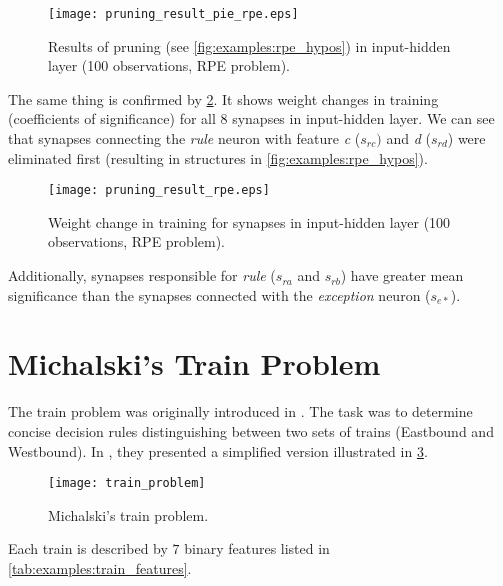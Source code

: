 \begin{figure}[H]
\centering
\texttt{[image: pruning\_result\_pie\_rpe.eps]}
\caption{Results of pruning (see \cref{fig:examples:rpe_hypos}) in input-hidden layer (100 observations, RPE problem).}
\label{fig:examples:pruning_result_pie_rpe}
\end{figure}

The same thing is confirmed by \cref{fig:examples:pruning_result_rpe}. It shows weight changes in training (coefficients of significance) for all 8 synapses in input-hidden layer. We can see that synapses connecting the \textit{rule} neuron with feature \textit{c} ($ s_{rc}) $ and \textit{d} ($ s_{rd} $) were eliminated first (resulting in structures in \cref{fig:examples:rpe_hypos}).

\begin{figure}[H]
\centering
\texttt{[image: pruning\_result\_rpe.eps]}
\caption{Weight change in training for synapses in input-hidden layer (100 observations, RPE problem).}
\label{fig:examples:pruning_result_rpe}
\end{figure}

Additionally, synapses responsible for \textit{rule} ($ s_{ra} $ and $ s_{rb} $) have greater mean significance than the synapses connected with the \textit{exception} neuron ($ s_{e*} $).

\section{Michalski's Train Problem} \label{sec:dataset_train}
The train problem was originally introduced in \citep{michalski}. The task was to determine concise decision rules distinguishing between two sets of trains (Eastbound and Westbound). In \citep{mozer_smolensky}, they presented a simplified version illustrated in \cref{fig:examples:dataset_train}.

\begin{figure}[H]
\centering
\texttt{[image: train\_problem]}
\caption{Michalski's train problem.}
\label{fig:examples:dataset_train}
\end{figure}

Each train is described by $ 7 $ binary features listed in \cref{tab:examples:train_features}.

